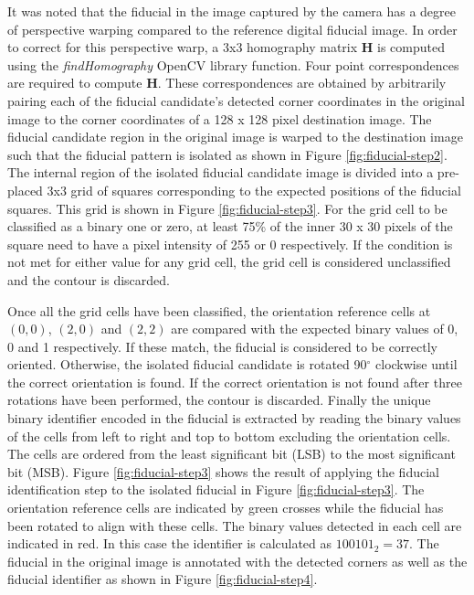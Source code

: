 It was noted that the fiducial in the image captured by the camera has a degree of perspective warping compared to the reference digital fiducial image. In order to correct for this perspective warp, a 3x3 homography matrix \textbf{H} is computed using the \textit{findHomography} OpenCV library function. Four point correspondences are required to compute \textbf{H}. These correspondences are obtained by arbitrarily pairing each of the fiducial candidate's detected corner coordinates in the original image to the corner coordinates of a 128 x 128 pixel destination image. The fiducial candidate region in the original image is warped to the destination image such that the fiducial pattern is isolated as shown in Figure \ref{fig:fiducial-step2}. The internal region of the isolated fiducial candidate image is divided into a pre-placed 3x3 grid of squares corresponding to the expected positions of the fiducial squares. This grid is shown in Figure \ref{fig:fiducial-step3}. For the grid cell to be classified as a binary one or zero, at least 75\% of the inner 30 x 30 pixels of the square need to have a pixel intensity of 255 or 0 respectively. If the condition is not met for either value for any grid cell, the grid cell is considered unclassified and the contour is discarded.

Once all the grid cells have been classified, the orientation reference cells at $(0, 0)$, $(2, 0)$ and $(2,2)$ are compared with the expected binary values of 0, 0 and 1 respectively. If these match, the fiducial is considered to be correctly oriented. Otherwise, the isolated fiducial candidate is rotated 90$^{\circ}$ clockwise until the correct orientation is found. If the correct orientation is not found after three rotations have been performed, the contour is discarded. Finally the unique binary identifier encoded in the fiducial is extracted by reading the binary values of the cells from left to right and top to bottom excluding the orientation cells. The cells are ordered from the least significant bit (LSB) to the most significant bit (MSB). Figure \ref{fig:fiducial-step3} shows the result of applying the fiducial identification step to the isolated fiducial in Figure \ref{fig:fiducial-step3}. The orientation reference cells are indicated by green crosses while the fiducial has been rotated to align with these cells. The binary values detected in each cell are indicated in red. In this case the identifier is calculated as $100101_2=37$. The fiducial in the original image is annotated with the detected corners as well as the fiducial identifier as shown in Figure \ref{fig:fiducial-step4}.

